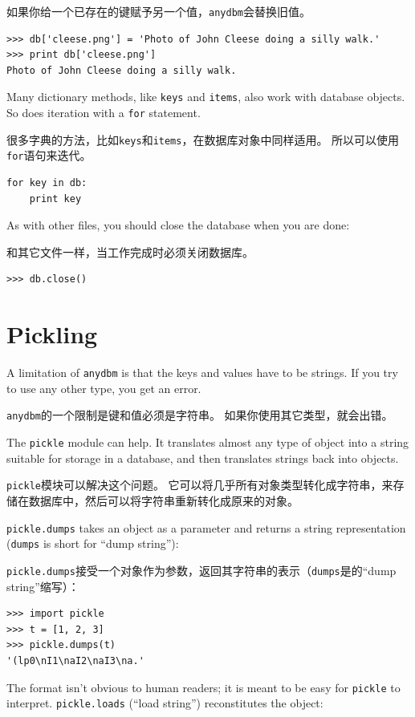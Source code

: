 \documentclass[10pt]{book}
\begin{document}
\begin{CJK}{UTF8}{gbsn}
如果你给一个已存在的键赋予另一个值，{\tt anydbm}会替换旧值。

\begin{verbatim}
>>> db['cleese.png'] = 'Photo of John Cleese doing a silly walk.'
>>> print db['cleese.png']
Photo of John Cleese doing a silly walk.
\end{verbatim}
%
Many dictionary methods, like {\tt keys} and {\tt items}, also
work with database objects.  So does iteration with a {\tt for}
statement.

很多字典的方法，比如{\tt keys}和{\tt items}，在数据库对象中同样适用。
所以可以使用{\tt for}语句来迭代。

\begin{verbatim}
for key in db:
    print key
\end{verbatim}
%
As with other files, you should close the database when you are
done:

和其它文件一样，当工作完成时必须关闭数据库。

\begin{verbatim}
>>> db.close()
\end{verbatim}
%


\section{Pickling}

A limitation of {\tt anydbm} is that the keys and values have
to be strings.  If you try to use any other type, you get an
error.

{\tt anydbm}的一个限制是键和值必须是字符串。
如果你使用其它类型，就会出错。

The {\tt pickle} module can help.  It translates
almost any type of object into a string suitable for storage in a
database, and then translates strings back into objects.

{\tt pickle}模块可以解决这个问题。
它可以将几乎所有对象类型转化成字符串，来存储在数据库中，然后可以将字符串重新转化成原来的对象。

{\tt pickle.dumps} takes an object as a parameter and returns
a string representation ({\tt dumps} is short for ``dump string''):

{\tt pickle.dumps}接受一个对象作为参数，返回其字符串的表示（{\tt dumps}是的``dump string''缩写）：

\begin{verbatim}
>>> import pickle
>>> t = [1, 2, 3]
>>> pickle.dumps(t)
'(lp0\nI1\naI2\naI3\na.'
\end{verbatim}
%
The format isn't obvious to human readers; it is meant to be
easy for {\tt pickle} to interpret.  {\tt pickle.loads}
(``load string'') reconstitutes the object:


\end{CJK}
\end{document}
